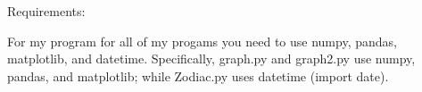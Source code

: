 Requirements:

For my program for all of my progams you need to use numpy, pandas, matplotlib, and datetime. 
Specifically, graph.py and graph2.py use numpy, pandas, and matplotlib; while Zodiac.py uses datetime (import date). 